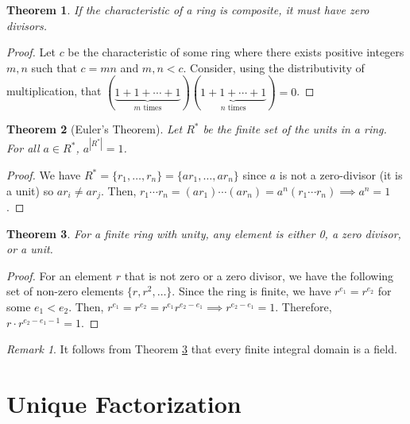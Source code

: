 \documentclass[
    parskip=half,
    toc=flat,
    toc=sectionentrydotfill,
]{scrartcl}  %
\theoremstyle{definition}
\theoremstyle{plain}
\newtheorem{theorem}{Theorem}[definition]
\theoremstyle{remark}
\newtheorem{remark}{Remark}[definition]
\begin{document}
\begin{theorem}
    \label{thm:composite characteristic implies zero divisor}
    If the characteristic of a ring is composite, it must have zero divisors.
\end{theorem}

\begin{proof}
    Let $c$ be the characteristic of some ring where there exists positive
    integers $m,n$ such that $c=mn$ and $m,n<c$.
    Consider, using the distributivity of multiplication, that
    $(\underbrace{1+1+\cdots+1}_{m\text{ times}})(\underbrace{1+1+\cdots+1}_{n\text{ times}})=0$.
\end{proof}

\begin{theorem}[Euler's Theorem]
    \label{thm:Euler's Theorem}
    Let $R^*$ be the finite set of the units in a ring.
    For all $a\in R^*$, $a^{|R^*|}=1$.
\end{theorem}

\begin{proof}
    We have $R^*=\{r_1,\dots,r_n\}=\{ar_1,\dots,ar_n\}$ since $a$ is not a
    zero-divisor (it is a unit) so $ar_i\neq ar_j$.
    Then, $r_1\cdots r_n=(ar_1)\cdots (ar_n)=a^n(r_1\cdots r_n)\implies a^n=1$.
\end{proof}

\begin{theorem}
    \label{thm:finite ring with unity}
    For a finite ring with unity, any element is either 0, a zero divisor, or a
    unit.
\end{theorem}

\begin{proof}
    For an element $r$ that is not zero or a zero divisor, we have the
    following set of non-zero elements $\{r,r^2,\dots\}$.
    Since the ring is finite, we have $r^{e_1}=r^{e_2}$ for some $e_1<e_2$.
    Then, $r^{e_1}=r^{e_2}=r^{e_1}r^{e_2-e_1}\implies r^{e_2-e_1}=1$.
    Therefore, $r\cdot r^{e_2-e_1-1}=1$.
\end{proof}

\begin{remark}
    It follows from Theorem \ref{thm:finite ring with unity} that every finite
    integral domain is a field.
\end{remark}


\section{Unique Factorization}
\end{document}
